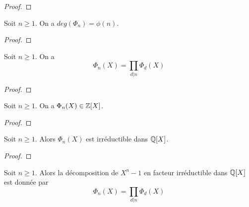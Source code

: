 \ifdefined\outputproof
\begin{proof}

\end{proof}
\fi

\begin{proposition}
	Soit $n \geq 1$. On a $deg(\Phi_{n}) = \phi(n)$.
\end{proposition}

\ifdefined\outputproof
\begin{proof}

\end{proof}
\fi

\begin{proposition}
	Soit $n \geq 1$. On a
	\begin{equation}
		\Phi_{n}(X) = \prod_{d | n} \Phi_{d}(X)
	\end{equation}
\end{proposition}

\ifdefined\outputproof
\begin{proof}

\end{proof}
\fi

\begin{proposition}
	Soit $n \geq 1$. On a $\Phi_{n} (X) \in \mathbb{Z}[X]$.
\end{proposition}

\ifdefined\outputproof
\begin{proof}

\end{proof}
\fi

\begin{theorem}
	Soit $n \geq 1$. Alors $\Phi_{n}(X)$ est irréductible dans $\mathbb{Q}[X]$.
\end{theorem}

\ifdefined\outputproof
\begin{proof}

\end{proof}
\fi

\begin{proposition}
	Soit $n \geq 1$. Alors la décomposition de $X^{n} - 1$ en facteur
	irréductible dans $\mathbb{Q}[X]$ est donnée par
	\begin{equation}
		\Phi_{n}(X) = \prod_{d | n} \Phi_{d}(X)
	\end{equation}
\end{proposition}
